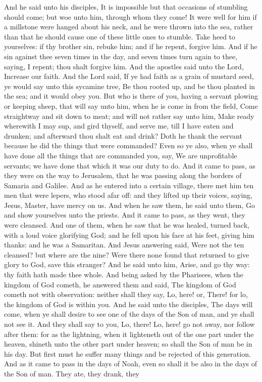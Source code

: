And he said unto his disciples, It is impossible but that occasions of stumbling should come; but woe unto him, through whom they come! It were well for him if a millstone were hanged about his neck, and he were thrown into the sea, rather than that he should cause one of these little ones to stumble. Take heed to yourselves: if thy brother sin, rebuke him; and if he repent, forgive him. And if he sin against thee seven times in the day, and seven times turn again to thee, saying, I repent; thou shalt forgive him.  And the apostles said unto the Lord, Increase our faith. And the Lord said, If ye had faith as a grain of mustard seed, ye would say unto this sycamine tree, Be thou rooted up, and be thou planted in the sea; and it would obey you. But who is there of you, having a servant plowing or keeping sheep, that will say unto him, when he is come in from the field, Come straightway and sit down to meat; and will not rather say unto him, Make ready wherewith I may sup, and gird thyself, and serve me, till I have eaten and drunken; and afterward thou shalt eat and drink? Doth he thank the servant because he did the things that were commanded? Even so ye also, when ye shall have done all the things that are commanded you, say, We are unprofitable servants; we have done that which it was our duty to do.  And it came to pass, as they were on the way to Jerusalem, that he was passing along the borders of Samaria and Galilee. And as he entered into a certain village, there met him ten men that were lepers, who stood afar off: and they lifted up their voices, saying, Jesus, Master, have mercy on us. And when he saw them, he said unto them, Go and show yourselves unto the priests. And it came to pass, as they went, they were cleansed. And one of them, when he saw that he was healed, turned back, with a loud voice glorifying God; and he fell upon his face at his feet, giving him thanks: and he was a Samaritan. And Jesus answering said, Were not the ten cleansed? but where are the nine? Were there none found that returned to give glory to God, save this stranger? And he said unto him, Arise, and go thy way: thy faith hath made thee whole.  And being asked by the Pharisees, when the kingdom of God cometh, he answered them and said, The kingdom of God cometh not with observation: neither shall they say, Lo, here! or, There! for lo, the kingdom of God is within you.  And he said unto the disciples, The days will come, when ye shall desire to see one of the days of the Son of man, and ye shall not see it. And they shall say to you, Lo, there! Lo, here! go not away, nor follow after them: for as the lightning, when it lighteneth out of the one part under the heaven, shineth unto the other part under heaven; so shall the Son of man be in his day. But first must he suffer many things and be rejected of this generation. And as it came to pass in the days of Noah, even so shall it be also in the days of the Son of man. They ate, they drank, they 